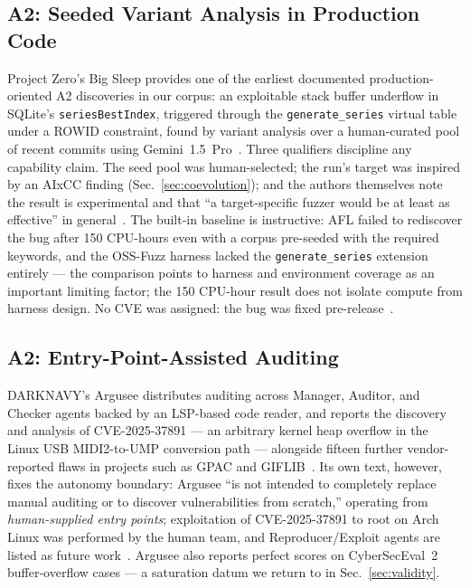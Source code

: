 \subsection{A2: Seeded Variant Analysis in Production Code}
Project Zero's Big Sleep provides one of the earliest documented production-oriented A2 discoveries in our corpus: an
exploitable stack buffer underflow in SQLite's \texttt{seriesBestIndex}, triggered through the
\texttt{generate\_series} virtual table under a ROWID constraint, found by variant analysis over
a human-curated pool of recent commits using Gemini~1.5~Pro~\cite{bigsleep2024naptime}. Three
qualifiers discipline any capability claim. The seed pool was human-selected; the run's target
was inspired by an AIxCC finding (Sec.~\ref{sec:coevolution}); and the authors themselves note
the result is experimental and that ``a target-specific fuzzer would be at least as effective''
in general~\cite{bigsleep2024naptime}. The built-in baseline is instructive: AFL failed to
rediscover the bug after 150 CPU-hours even with a corpus pre-seeded with the required keywords,
and the OSS-Fuzz harness lacked the \texttt{generate\_series} extension entirely
--- the comparison points to harness and environment coverage as an important limiting factor; the 150 CPU-hour result does not isolate compute from harness design.
No CVE was assigned: the bug was fixed pre-release~\cite{bigsleep2024naptime}.

\subsection{A2: Entry-Point-Assisted Auditing}
DARKNAVY's Argusee distributes auditing across Manager, Auditor, and Checker agents backed by an
LSP-based code reader, and reports the discovery and analysis of CVE-2025-37891 --- an arbitrary
kernel heap overflow in the Linux USB MIDI2-to-UMP conversion path --- alongside fifteen further
vendor-reported flaws in projects such as GPAC and GIFLIB~\cite{darknavyargusee2025}. Its own
text, however, fixes the autonomy boundary: Argusee ``is not intended to completely replace
manual auditing or to discover vulnerabilities from scratch,'' operating from
\emph{human-supplied entry points}; exploitation of CVE-2025-37891 to root on Arch Linux was
performed by the human team, and Reproducer/Exploit agents are listed as future
work~\cite{darknavyargusee2025}. Argusee also reports perfect scores on CyberSecEval~2
buffer-overflow cases --- a saturation datum we return to in Sec.~\ref{sec:validity}.

